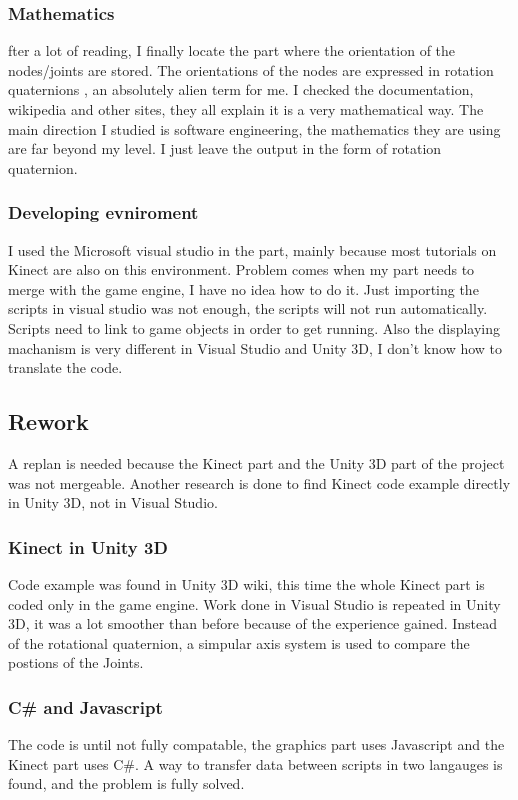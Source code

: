 \documentclass[fonts]{icst}
\begin{document}
\subsubsection{Mathematics}
fter a lot of reading, I finally locate the part where the orientation of the nodes/joints are stored. The orientations of the nodes are expressed in rotation quaternions , an absolutely alien term for me. I checked the documentation, wikipedia and other sites, they all explain it is a very mathematical way. The main direction I studied is software engineering, the mathematics they are using are far beyond my level. I just leave the output in the form of rotation quaternion.

\subsubsection{Developing evniroment}
I used the Microsoft visual studio in the part, mainly because most tutorials on Kinect are also on this environment. Problem comes when my part needs to merge with the game engine, I have no idea how to do it. Just importing the scripts in visual studio was not enough, the scripts will not run automatically. Scripts need to link to game objects in order to get running. Also the displaying machanism is very different in Visual Studio and Unity 3D, I don't know how to translate the code.

\subsection{Rework}
A replan is needed because the Kinect part and the Unity 3D part of the project was not mergeable. Another research is done to find Kinect code example directly in Unity 3D, not in Visual Studio. 

\subsubsection{Kinect in Unity 3D}
Code example was found in Unity 3D wiki, this time the whole Kinect part is coded only in the game engine. Work done in Visual Studio is repeated in Unity 3D, it was a lot smoother than before because of the experience gained. Instead of the rotational quaternion, a simpular axis system is used to compare the postions of the Joints. 

\subsubsection{C\# and Javascript}
The code is until not fully compatable, the graphics part uses Javascript and the Kinect part uses C\#. A way to transfer data between scripts in two langauges is found, and the problem is fully solved.
\end{document}
